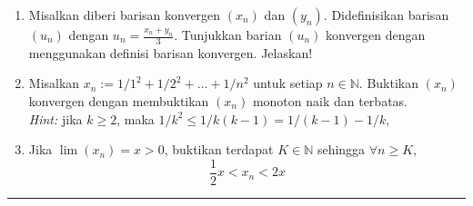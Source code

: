 \documentclass{article}
\begin{document}
\begin{enumerate}[leftmargin=*, label={\arabic*}.]
\item Misalkan diberi barisan konvergen $(x_n)$ dan $(y_n)$. Didefinisikan barisan
$(u_n)$ dengan $u_n=\frac{x_n+y_n}{3}$. Tunjukkan barian $(u_n)$ konvergen dengan 
menggunakan definisi barisan konvergen. Jelaskan!

\item Misalkan $x_n := 1/1^2+1/2^2+\dots+1/n^2$ untuk setiap $n \in \mathbb{N}$. Buktikan $(x_n)$ konvergen dengan
membuktikan $(x_n)$ monoton naik dan terbatas. \\\textit{Hint:} jika $k \geq 2$, maka $1/k^2\leq 1/k(k-1)=1/(k-1)-1/k$,

\item Jika $\lim(x_n)=x > 0$, buktikan terdapat $K \in \mathbb{N}$ sehingga $\forall n \geq K$,
\[
    \frac{1}{2}x < x_n < 2x
\]
\end{enumerate}

\vspace{0.2cm}\hrule height 1pt
\end{document}
